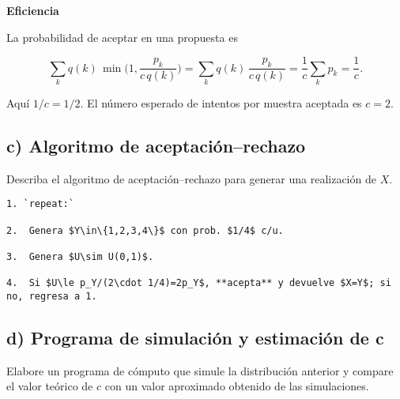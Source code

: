 \documentclass[10pt,a4paper]{article}
\let\le\leqslant
\let\leq\leqslant
\let\le\leq
\begin{document}
\textbf{Eficiencia}

La probabilidad de aceptar en una propuesta es

\[
\sum_{k} q(k)\,\min\!\Big(1,\frac{p_k}{c\,q(k)}\Big)
=\sum_k q(k)\,\frac{p_k}{c\,q(k)}=\frac{1}{c}\sum_k p_k=\frac{1}{c}.
\]

Aquí \(1/c=1/2\). El número esperado de intentos por muestra aceptada es
\(c=2\).

    \hypertarget{c-algoritmo-de-aceptaciuxf3nrechazo}{%
\subsection{c) Algoritmo de
aceptación--rechazo}\label{c-algoritmo-de-aceptaciuxf3nrechazo}}

    Describa el algoritmo de aceptación--rechazo para generar una
realización de \(X\).

    \begin{verbatim}
1. `repeat:`

2.  Genera $Y\in\{1,2,3,4\}$ con prob. $1/4$ c/u.

3.  Genera $U\sim U(0,1)$.

4.  Si $U\le p_Y/(2\cdot 1/4)=2p_Y$, **acepta** y devuelve $X=Y$; si no, regresa a 1.
\end{verbatim}

    \hypertarget{d-programa-de-simulaciuxf3n-y-estimaciuxf3n-de-c}{%
\subsection{d) Programa de simulación y estimación de
c}\label{d-programa-de-simulaciuxf3n-y-estimaciuxf3n-de-c}}

    Elabore un programa de cómputo que simule la distribución anterior y
compare el valor teórico de \(c\) con un valor aproximado obtenido de
las simulaciones.
\end{document}
